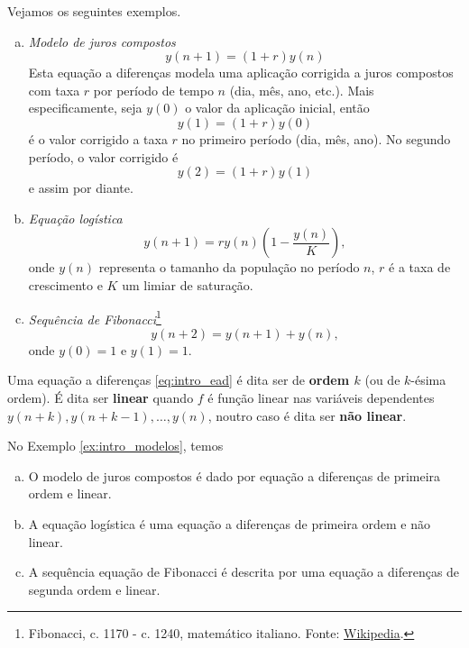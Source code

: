 \begin{ex}\label{ex:intro_modelos}
  Vejamos os seguintes exemplos.
  \begin{enumerate}[a)]
  \item \emph{Modelo de juros compostos}
    \begin{equation}
      y(n+1) = (1+r)y(n)
    \end{equation}
    Esta equação a diferenças modela uma aplicação corrigida a juros compostos com taxa $r$ por período de tempo $n$ (dia, mês, ano, etc.). Mais especificamente, seja $y(0)$ o valor da aplicação inicial, então
    \begin{equation}
      y(1) = (1+r)y(0)
    \end{equation}
    é o valor corrigido a taxa $r$ no primeiro período (dia, mês, ano). No segundo período, o valor corrigido é
    \begin{equation}
      y(2) = (1+r)y(1)
    \end{equation}
    e assim por diante.
  \item \emph{Equação logística}
    \begin{equation}
      y(n+1) = r y(n)\left(1 - \frac{y(n)}{K}\right),
    \end{equation}
    onde $y(n)$ representa o tamanho da população no período $n$, $r$ é a taxa de crescimento e $K$ um limiar de saturação.
  \item \emph{Sequência de Fibonacci}\footnote{Fibonacci, c. 1170 - c. 1240, matemático italiano. Fonte: \href{https://en.wikipedia.org/wiki/Fibonacci}{Wikipedia}.}
    \begin{equation}
      y(n+2) = y(n+1) + y(n),
    \end{equation}
    onde $y(0)=1$ e $y(1)=1$.
  \end{enumerate}
\end{ex}

Uma equação a diferenças \eqref{eq:intro_ead} é dita ser de {\bf ordem $k$} (ou de $k$-ésima ordem). É dita ser {\bf linear} quando $f$ é função linear nas variáveis dependentes $y(n+k), y(n+k-1), \dotsc, y(n)$, noutro caso é dita ser {\bf não linear}.

\begin{ex}
  No Exemplo \ref{ex:intro_modelos}, temos
  \begin{enumerate}[a)]
  \item O modelo de juros compostos é dado por equação a diferenças de primeira ordem e linear.
  \item A equação logística é uma equação a diferenças de primeira ordem e não linear.
  \item A sequência equação de Fibonacci é descrita por uma equação a diferenças de segunda ordem e linear.
  \end{enumerate}
\end{ex}

